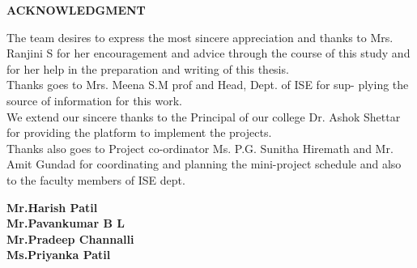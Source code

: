 %



\maketitle
\thispagestyle{empty}
\pagestyle{empty}
\normalsize
\newpage
\begin{center}
\huge \textbf{ACKNOWLEDGMENT}
\end{center}

\vspace{0.5cm}
The team desires to express the most sincere appreciation and thanks to
Mrs. Ranjini S for her encouragement and advice through the course of
this study and for her help in the preparation and writing of this thesis.\\

Thanks goes to Mrs. Meena S.M prof and Head, Dept. of ISE for sup-
plying the source of information for this work.\\
		
We extend our sincere thanks to the Principal of our college Dr. Ashok
Shettar for providing the platform to implement the projects.\\

Thanks also goes to Project co-ordinator Ms. P.G. Sunitha Hiremath
and Mr. Amit Gundad for coordinating and planning the mini-project
schedule and also to the faculty members of ISE dept.
		
											
\begin{flushright}
\textbf{Mr.Harish Patil}\\
\textbf{Mr.Pavankumar B L}\\
\textbf{Mr.Pradeep Channalli}\\
\textbf{Ms.Priyanka Patil}
\end{flushright}

\maketitle
\thispagestyle{empty}
\pagestyle{empty}